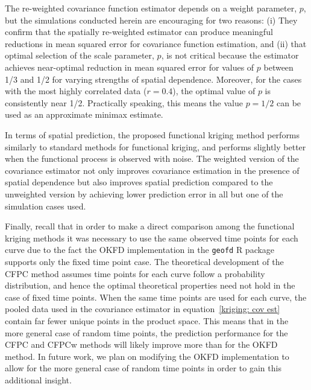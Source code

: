 The re-weighted covariance function estimator depends on a weight parameter, $p$, but the simulations conducted herein are encouraging for two reasons: (i) They confirm that the spatially re-weighted estimator can produce meaningful reductions in mean squared error for covariance function estimation, and (ii) that optimal selection of the scale parameter, $p$, is not critical because the estimator achieves near-optimal reduction in mean squared error for values of $p$ between 1/3 and 1/2 for varying strengths of spatial dependence. Moreover, for the cases with the most highly correlated data ($r = 0.4$), the optimal value of $p$ is consistently near 1/2. Practically speaking, this means the value $p = 1/2$ can be used as an approximate minimax estimate. 

In terms of spatial prediction, the proposed functional kriging method performs similarly to standard methods for functional kriging, and performs slightly better when the functional process is observed with noise. The weighted version of the covariance estimator not only improves covariance estimation in the presence of spatial dependence but also improves spatial prediction compared to the unweighted version by achieving lower prediction error in all but one of the simulation cases used. 

Finally, recall that in order to make a direct comparison among the functional kriging methods it was necessary to use the same observed time points for each curve due to the fact the OKFD implementation in the \texttt{geofd} R package supports only the fixed time point case. The theoretical development of the CFPC method assumes time points for each curve follow a probability distribution, and hence the optimal theoretical properties need not hold in the case of fixed time points. When the same time points are used for each curve, the pooled data used in the covariance estimator in equation~\eqref{kriging: cov est} contain far fewer unique points in the product space. This means that in the more general case of random time points, the prediction performance for the CFPC and CFPCw methods will likely improve more than for the OKFD method. In future work, we plan on modifying the OKFD implementation to allow for the more general case of random time points in order to gain this additional insight. 

